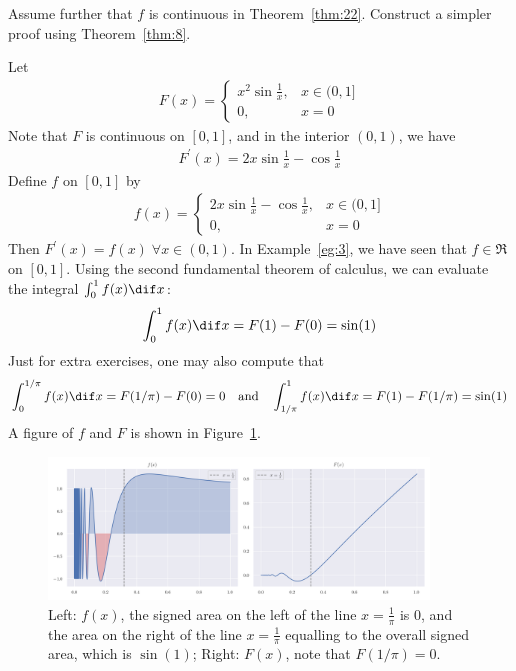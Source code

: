 \documentclass[thmcnt=section, color=blue, 12pt]{my-elegantbook}
\begin{document}
\begin{exercise}
	Assume further that $f$ is continuous in Theorem~\ref{thm:22}.
	Construct a simpler proof using Theorem~\ref{thm:8}.
\end{exercise}

\begin{example}
	Let
	\begin{align*}
		F(x) =\begin{cases}
			      x^2 \sin \frac{1}{x}, & x\in (0, 1] \\
			      0,                    & x=0
		      \end{cases}
	\end{align*}
	Note that $F$ is continuous on $[0, 1]$, and in the interior $(0, 1)$,
	we have
	\begin{align*}
		F^\prime(x) = 2x \sin \frac{1}{x} - \cos \frac{1}{x}
	\end{align*}
	Define $f$ on $[0, 1]$ by
	\begin{align*}
		f(x) = \begin{cases}
			       2x \sin \frac{1}{x} - \cos \frac{1}{x}, & x \in (0, 1] \\
			       0,                                      & x=0
		       \end{cases}
	\end{align*}
	Then $F^\prime(x) = f(x) \; \forall x \in (0, 1)$.
	In Example~\ref{eg:3}, we have seen that $f \in \mathfrak{R}$ on $[0, 1]$.
	Using the second fundamental theorem of calculus,
	we can evaluate the integral $\int_0^1 f(x) \dif x$:
	\begin{align*}
		\int_0^1 f(x) \dif x = F(1) - F(0) = \sin(1)
	\end{align*}
	Just for extra exercises, one may also compute that
	\begin{align*}
		\int_0^{1/\pi} f(x) \dif x = F(1/\pi) - F(0) = 0
		\quad \text{and} \quad
		\int_{1/\pi}^1 f(x) \dif x = F(1) - F(1/\pi) = \sin(1)
	\end{align*}
	A figure of $f$ and $F$ is shown in Figure~\ref{fig:10}.

	\begin{figure}[H]
		\centering
		\includegraphics[width=0.9\textwidth]{figures/second-fundamental-theorem-of-calculus-example-1.png}
		\caption{Left: $f(x)$, the signed area on the left of
			the line $x=\frac{1}{\pi}$ is $0$,
			and the area on the right of the line $x=\frac{1}{\pi}$
			equalling to the overall signed area, which is $\sin(1)$;
			Right: $F(x)$, note that $F(1 / \pi) = 0$.}
		\label{fig:10}
	\end{figure}
\end{example}
\end{document}
